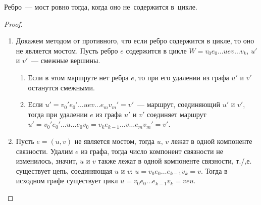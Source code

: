 \begin{statement}
	Ребро~--- мост ровно тогда, когда оно не~содержится в~цикле.
\end{statement}
\begin{proof}
\begin{enumerate}
	\item Докажем методом от противного, что если ребро содержится в цикле, то оно не является мостом. Пусть ребро $e$ содержится в цикле $W = v_0 e_0 \ldots u e v \ldots v_k$, $u'$ и $v'$~--- смежные вершины.
	\begin{enumerate}
		\item Если в этом маршруте нет ребра $e$, то при его удалении из графа $u'$ и $v'$ останутся смежными.
		\item Если $u' = v_0' e_0' \ldots u e v \ldots e_m v_m' = v'$~--- маршрут, соединяющий $u'$ и $v'$, тогда при удалении $e$ из графа $u'$ и $v'$ соединяет маршрут $u' = v_0' e_0' \ldots u \ldots e_0 v_0 = v_k e_{k-1} \ldots v \ldots e_m v_m' = v'$.
	\end{enumerate}
	\item Пусть $e = (u, v)$ не является мостом, тогда $u$, $v$ лежат в одной компоненте связности. Удалим $e$ из графа, тогда число компонент связности не изменилось, значит, $u$ и $v$ также лежат в одной компоненте связности, т./,е. существует цепь, соединяющая $u$ и $v$: $u = v_0 e_0 \ldots e_{k-1} v_k = v$. Тогда в исходном графе существует цикл $u = v_0 e_0 \ldots e_{k-1} v_k = v e u$.
\end{enumerate}
\end{proof}

